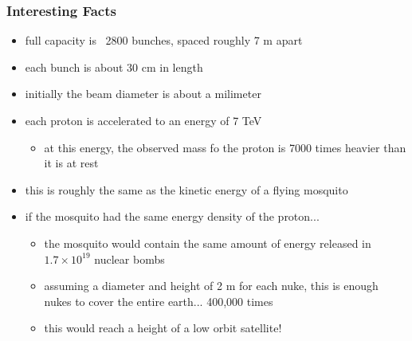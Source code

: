 \documentclass[
	11pt, %
]{beamer}
\begin{document}
\begin{frame}
\frametitle{Interesting Facts}
\begin{itemize}
	\item full capacity is ~2800 bunches, spaced roughly 7 m apart
	\item each bunch is about 30 cm in length
	\item initially the beam diameter is about a milimeter
	\item each proton is accelerated to an energy of 7 TeV
		\begin{itemize}
			\item at this energy, the observed mass fo the proton is 7000 times heavier than it is at rest
		\end{itemize}
	\item this is roughly the same as the kinetic energy of a flying mosquito
	\item if the mosquito had the same energy density of the proton...
	\begin{itemize}
		\item the mosquito would contain the same amount of energy released in $1.7 \times 10^{19}$ nuclear bombs
		\item assuming a diameter and height of 2 m for each nuke, this is enough nukes to cover the entire earth... 400,000 times
		\item this would reach a height of a low orbit satellite!
		\end{itemize}

\end{itemize}

\end{frame}
\end{document}
